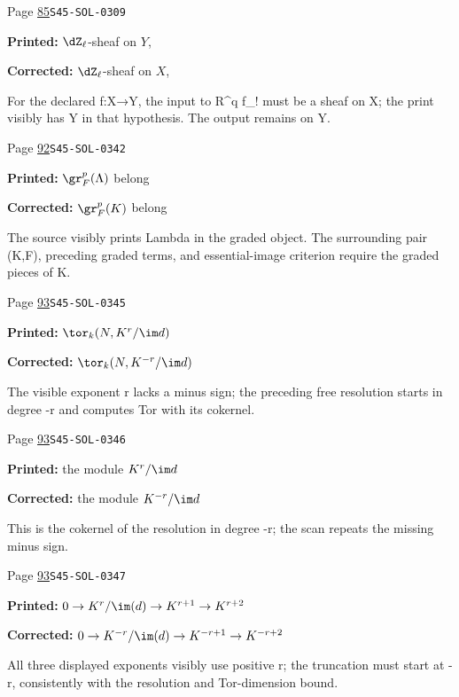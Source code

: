 \begin{description}
\smallskip
\item[\hypertarget{apparatus:EN-0027}{27}] Page \hyperlink{printpage:en:85}{85}\quad\texttt{S45-SOL-0309}
\par\noindent\textbf{Printed:} $\dZ_\ell$-sheaf on $Y$,
\par\noindent\textbf{Corrected:} $\dZ_\ell$-sheaf on $X$,
\par\noindent For the declared f:X→Y, the input to R\textasciicircum{}q f\_! must be a sheaf on X; the print visibly has Y in that hypothesis. The output remains on Y.
\smallskip
\item[\hypertarget{apparatus:EN-0028}{28}] Page \hyperlink{printpage:en:92}{92}\quad\texttt{S45-SOL-0342}
\par\noindent\textbf{Printed:} $\gr_F^p(\Lambda)$ belong
\par\noindent\textbf{Corrected:} $\gr_F^p(K)$ belong
\par\noindent The source visibly prints Lambda in the graded object. The surrounding pair (K,F), preceding graded terms, and essential-image criterion require the graded pieces of K.
\smallskip
\item[\hypertarget{apparatus:EN-0029}{29}] Page \hyperlink{printpage:en:93}{93}\quad\texttt{S45-SOL-0345}
\par\noindent\textbf{Printed:} \(\tor_k(N,K^r/\im d)\)
\par\noindent\textbf{Corrected:} \(\tor_k(N,K^{-r}/\im d)\)
\par\noindent The visible exponent r lacks a minus sign; the preceding free resolution starts in degree -r and computes Tor with its cokernel.
\smallskip
\item[\hypertarget{apparatus:EN-0030}{30}] Page \hyperlink{printpage:en:93}{93}\quad\texttt{S45-SOL-0346}
\par\noindent\textbf{Printed:} the module $K^r/\im d$
\par\noindent\textbf{Corrected:} the module $K^{-r}/\im d$
\par\noindent This is the cokernel of the resolution in degree -r; the scan repeats the missing minus sign.
\smallskip
\item[\hypertarget{apparatus:EN-0031}{31}] Page \hyperlink{printpage:en:93}{93}\quad\texttt{S45-SOL-0347}
\par\noindent\textbf{Printed:} \(0 \to K^r/\im(d) \to K^{r+1} \to K^{r+2}\)
\par\noindent\textbf{Corrected:} \(0 \to K^{-r}/\im(d) \to K^{-r+1} \to K^{-r+2}\)
\par\noindent All three displayed exponents visibly use positive r; the truncation must start at -r, consistently with the resolution and Tor-dimension bound.

\end{description}
